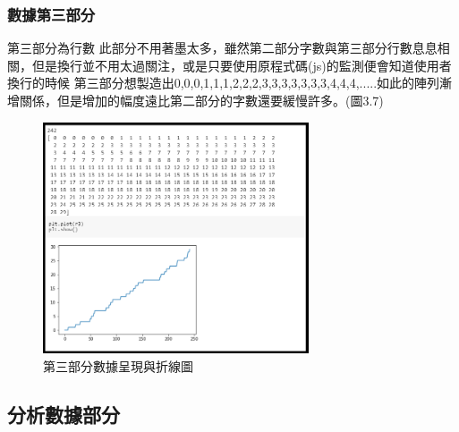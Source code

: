 \subsubsection{數據第三部分}
第三部分為行數 此部分不用著墨太多，雖然第二部分字數與第三部分行數息息相關，但是換行並不用太過關注，或是只要使用原程式碼(js)的監測便會知道使用者換行的時候
第三部分想製造出0,0,0,1,1,1,2,2,2,3,3,3,3,3,3,3,4,4,4,.....如此的陣列漸增關係，但是增加的幅度遠比第二部分的字數還要緩慢許多。(圖3.7)
	\begin{figure}[H] %
	\centering %
	\includegraphics[width=0.7\textwidth]{3_2_1_5.png} %
	\caption{第三部分數據呈現與折線圖} %
	\label{Fig.3.7} %
	\end{figure}
\subsection{分析數據部分}
